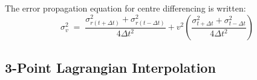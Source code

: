 \documentclass[namedreferences]{SolarPhysics}
\begin{document}
\begin{article}

The error propagation equation for centre differencing is written:
\begin{equation}
\sigma_v^2 \; = \; \frac{\sigma_{r(t+\Delta t)}^2+\sigma_{r(t-\Delta t)}^2}{4 \Delta t^2} + v^2 \left( \frac{\sigma_{t+\Delta t}^2+\sigma_{t-\Delta t}^2}{4 \Delta t^2} \right) %
\end{equation}


\subsection{3-Point Lagrangian Interpolation}
\label{sect_lagrangian}


\end{article}
\end{document}

